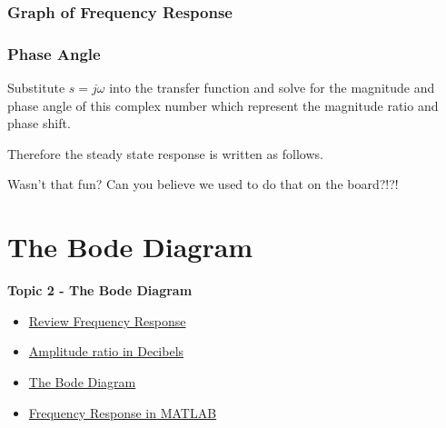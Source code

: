 \documentclass[fleqn]{beamer} %
\newcommand{\sectionIItitle}{The Bode Diagram}
\newcommand{\sectionIsubsectionIVtitle}{Graph of Frequency Response}
\newcommand{\sectionIIsubsectionItitle}{Review Frequency Response}
\newcommand{\sectionIIsubsectionIItitle}{Amplitude ratio in Decibels}
\newcommand{\sectionIIsubsectionIIItitle}{The Bode Diagram}
\newcommand{\sectionIIsubsectionIVtitle}{Frequency Response in MATLAB}
\begin{document}
			\begin{frame}
				\frametitle{\sectionIsubsectionIVtitle}
				\bigskip
				\frametitle{Phase Angle}		
				\small

				\vspc

				\vspc
				\vspcc

				Substitute $s=j\omega$ into the transfer function and solve for the magnitude and phase angle of this complex number which represent the magnitude ratio and phase shift. \vspc

				Therefore the steady state response is written as follows.  \vspc

				\vspcc

				Wasn't that fun? Can you believe we used to do that on the board?!?! \vspc

				\btVFill
			\end{frame}
	
	\section{\sectionIItitle}\label{sectionII}

		\begin{frame}
			\large \textbf{Topic 2 - \sectionIItitle} \vspace{3mm}\\

			\begin{itemize}
				\item \hyperlink{sectionIIsubsectionI}{\sectionIIsubsectionItitle} \vspc %
				\item \hyperlink{sectionIIsubsectionII}{\sectionIIsubsectionIItitle} \vspc %
				\item \hyperlink{sectionIIsubsectionIII}{\sectionIIsubsectionIIItitle} \vspc %
				\item \hyperlink{sectionIIsubsectionIV}{\sectionIIsubsectionIVtitle} \vspc %
			\end{itemize}

		\end{frame}
\end{document}
